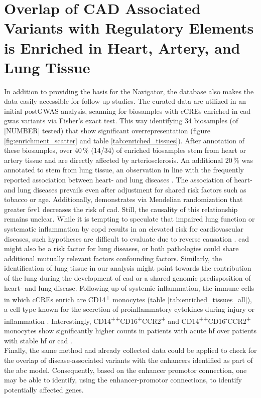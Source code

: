 \section{Overlap of CAD Associated Variants with Regulatory Elements is Enriched in Heart, Artery, and Lung Tissue}
In addition to providing the basis for the  Navigator, the database also makes the data easily accessible for follow-up studies. The curated data are utilized in an initial postGWAS analysis, scanning for biosamples with \acp{cCRE} enriched in \ac{cad} \ac{gwas} variants via Fisher's exact test. This way identifying 34 biosamples (of [NUMBER] tested) that show significant overrepresentation (figure \ref{fig:enrichment_scatter} and table \ref{tab:enriched_tissues}). After annotation of these biosamples, over 40\,\% (14/34) of enriched biosamples stem from heart or artery tissue and are directly affected by arteriosclerosis. An additional 20\,\% was annotated to stem from lung tissue, an observation in line with the frequently reported association between heart- and lung diseases \cite{carterAssociationCardiovascularDisease2019, hanPulmonaryDiseasesHeart2007}. The association of heart- and lung diseases prevails even after adjustment for shared risk factors such as tobacco or age. Additionally, \textcite{auyeungAssociationGeneticInstrumental2018} demonstrates via Mendelian randomization that greater \ac{fev1} decreases the risk of \ac{cad}. Still, the causality of this relationship remains unclear. While it is tempting to speculate that impaired lung function or systematic inflammation by \ac{copd} results in an elevated risk for cardiovascular diseases, such hypotheses are difficult to evaluate due to reverse causation \cite{nowakLungFunctionCoronary2018}. \ac{cad} might also be a risk factor for lung diseases, or both pathologies could share additional mutually relevant factors confounding factors. Similarly, the identification of lung tissue in our analysis might point towards the contribution of the lung during the development of \ac{cad} or a shared genomic predisposition of heart- and lung disease. Following up of systemic inflammation, the immune cells in which \acp{cCRE} enrich are CD14\textsuperscript{+} monocytes (table \ref{tab:enriched_tissues_all}), a cell type known for the secretion of proinflammatory cytokines during injury or inflammation \cite{kapellosHumanMonocyteSubsets2019}. Interestingly, CD14\textsuperscript{++}CD16\textsuperscript{+}CCR2\textsuperscript{+} and CD14\textsuperscript{++}CD16\textsuperscript{-}CCR2\textsuperscript{+} monocytes show significantly higher counts in patients with acute \ac{hf} over patients with stable \ac{hf} or \ac{cad} \cite{wrigleyCD14CD16Monocytes2013}.\\
Finally, the same method and already collected data could be applied to check for the overlap of disease-associated variants with the enhancers identified as part of the \ac{abc} model. Consequently, based on the enhancer promotor connection, one may be able to identify, using the enhancer-promotor connections, to identify potentially affected genes.
